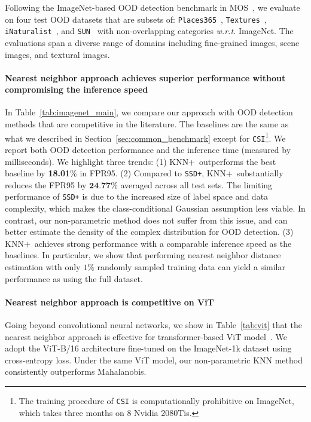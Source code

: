 \documentclass[nohyperref]{article}
\newcommand{\methodplus}{{KNN+}}
\theoremstyle{plain}
\theoremstyle{definition}
\theoremstyle{remark}
\begin{document}
Following the ImageNet-based OOD detection benchmark in MOS~\citep{huang2021mos}, we evaluate on four test OOD datasets that are subsets of: \texttt{Places365}~\citep{zhou2017places}, \texttt{Textures}~\citep{cimpoi2014describing}, \texttt{iNaturalist}~\citep{inat}, and \texttt{SUN}~\citep{sun} with non-overlapping categories \emph{w.r.t.} ImageNet. The evaluations span a diverse range of domains including fine-grained images, scene images, and textural images. 




\vspace{-0.2cm}
\paragraph{Nearest neighbor approach achieves superior performance without compromising the inference speed} In Table~\ref{tab:imagenet_main}, we compare our approach with OOD detection methods that are competitive in the literature. The baselines are the same as what we described in Section~\ref{sec:common_benchmark} except for \texttt{CSI}\footnote{The training procedure of \texttt{CSI} is computationally  prohibitive on ImageNet, which takes three months on 8 Nvidia 2080Tis.}. We report both  OOD detection performance and the inference time (measured by milliseconds). We highlight three trends: (1) \methodplus~outperforms the best baseline by \textbf{18.01}\% in FPR95. (2) Compared to \texttt{SSD+}, \methodplus~substantially reduces the FPR95 by $\textbf{24.77}\%$ averaged across all test sets. The limiting performance of \texttt{SSD+} is due to the increased size of label space and data complexity, which makes the class-conditional Gaussian assumption less viable. In contrast, our non-parametric method does not suffer from this issue, and can better estimate the density of the complex distribution for OOD detection. (3) \methodplus~achieves strong performance with a comparable inference speed as the baselines. In particular, we show that performing nearest neighbor distance estimation with only $1\%$ randomly sampled training data can yield a similar performance as using the full dataset. 




\paragraph{Nearest neighbor approach is competitive on ViT} Going beyond convolutional neural networks, we show in Table~\ref{tab:vit} that the nearest neighbor approach is effective for transformer-based  ViT model~\citep{dosovitskiy2020image}. We adopt the ViT-B/16 architecture fine-tuned on the ImageNet-1k dataset using cross-entropy loss. Under the same ViT model, our non-parametric KNN method consistently outperforms Mahalanobis. 
\end{document}
